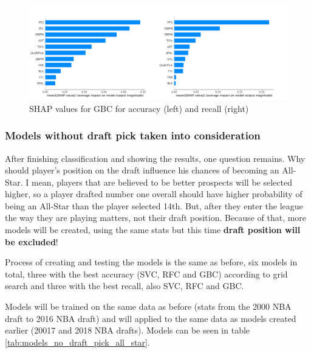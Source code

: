 \documentclass[a4paper]{article}
\begin{document}
\begin{figure}[h!]
\begin{center}
\includegraphics[scale=0.3]{gbc_shap.png}
\end{center}
\caption{SHAP values for GBC for accuracy (left) and recall (right)}
\label{plt:shap_gbc_all_star}
\end{figure}

\subsubsection{Models without draft pick taken into consideration}
\label{subsubsec:without_draft_pick_all_star}

After finishing classification and showing the results, one question remains. Why should player's position on the draft influence his chances of becoming an All-Star. I mean, players that are believed to be better prospects will be selected higher, so a player drafted number one overall should have higher probability of being an All-Star than the player selected 14th. But, after they enter the league the way they are playing matters, not their draft position. Because of that, more models will be created, using the same stats but this time \textbf{draft position will be excluded}!

Process of creating and testing the models is the same as before, six models in total, three with the best accuracy (SVC, RFC and GBC) according to grid search and three with the best recall, also SVC, RFC and GBC.

Models will be trained on the same data as before (stats from the 2000 NBA draft to 2016 NBA draft) and will applied to the same data as models created earlier (20017 and 2018 NBA drafts). Models can be seen in table \ref{tab:models_no_draft_pick_all_star}.
\end{document}
